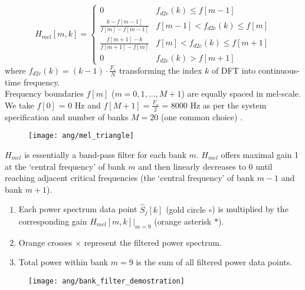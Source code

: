 
\begin{frame}
\begin{equation}
H_{mel}[m, k] =
\begin{cases}
0 &f_{d2c}(k) \le f[m-1]\\
\displaystyle\frac{k - f[m-1]}{f[m] - f[m-1]} &f[m-1] < f_{d2c}(k) \le f[m]\\
\displaystyle\frac{f[m+1] - k}{f[m+1] - f[m]} &f[m] < f_{d2c}(k) \le f[m+1]\\
0 &f_{d2c}(k) > f[m+1]
\end{cases}
\end{equation}
where $f_{d2c}(k) = (k-1) \cdot \frac{F_s}{N}$ transforming the index $k$ of DFT into continuous-time frequency.\\
\vspace{10pt}
Frequency boundaries $f[m]$ ($m = 0, 1, \dots, M+1$) are equally spaced in mel-scale. We take $f[0]$ = 0 Hz and $f[M+1] = \frac{F_s}{2}$ = 8000 Hz as per the system specification and number of banks $M = 20$ (one common choice) \cite{davis1980comparison}.
\end{frame}


\begin{frame}
\begin{figure}[H]
\centering
\texttt{[image: ang/mel\_triangle]}
\end{figure}

$H_{mel}$ is essentially a band-pass filter for each bank $m$. $H_{mel}$ offers maximal gain 1 at the `central frequency' of bank $m$ and then linearly decreases to 0 until reaching adjacent critical frequencies (the `central frequency' of bank $m-1$ and bank $m+1$).
\end{frame}


\begin{frame}
\begin{enumerate}
\item Each power spectrum data point $\hat{S}_j[k]$ (\textcolor{gold_matlab}{gold circle $\circ$}) is multiplied by the corresponding gain $H_{mel}[m, k]|_{m=9}$ (\textcolor{orange_matlab}{orange asterisk $*$}).
\item \textcolor{orange_matlab}{Orange crosses $\times$} represent the filtered power spectrum.
\item Total power within bank $m=9$ is the sum of all filtered power data points.
\end{enumerate}

\begin{figure}[H]
\centering
\texttt{[image: ang/bank\_filter\_demostration]}
\end{figure}
\end{frame}

